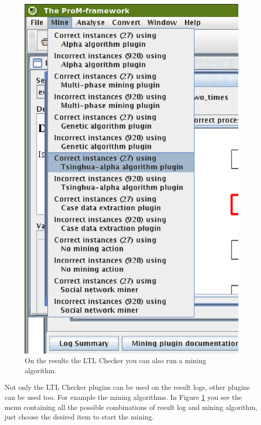 \begin{figure}[H]
    \includegraphics[scale=0.4]{images/framework-log-and-ltl-minemenu-cutted.eps}
    \caption{On the results the LTL Checker you can also run a mining
    algorithm.}
    \label{plugingui:mine}
\end{figure}

Not only the LTL Checker plugins can be used on the result logs, other plugins
can be used too. For example the mining algorithms. In Figure
\ref{plugingui:mine} you see the  menu containing all the possible
combinations of result log and mining algorithm, just choose the desired item
to start the mining.
